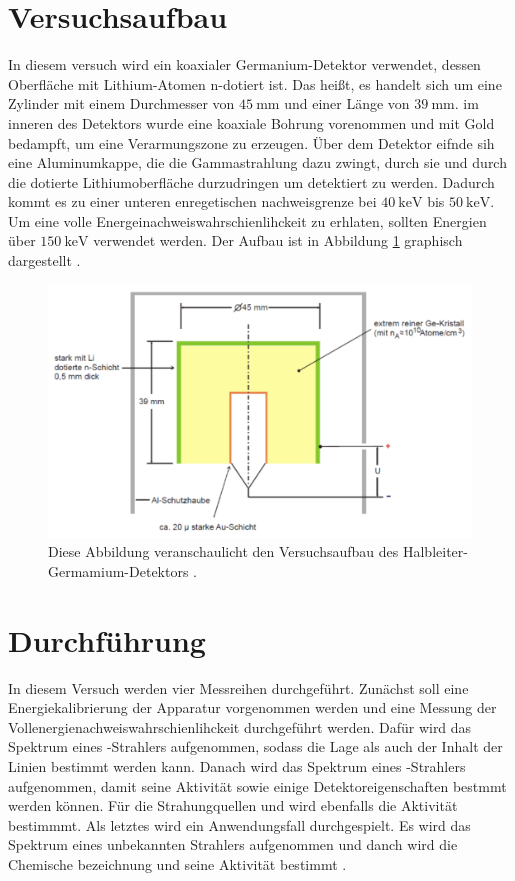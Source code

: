 \section{Versuchsaufbau}
In diesem versuch wird ein koaxialer Germanium-Detektor verwendet,
dessen Oberfläche mit Lithium-Atomen n-dotiert ist. Das heißt, es handelt 
sich um eine Zylinder mit einem Durchmesser von $\SI{45}{\milli\meter}$ und einer 
Länge von $\SI{39}{\milli\meter}$. 
im inneren des Detektors wurde eine koaxiale Bohrung vorenommen und mit Gold 
bedampft, um eine Verarmungszone zu erzeugen. 
Über dem Detektor eifnde sih eine Aluminumkappe, die die Gammastrahlung dazu zwingt, 
durch sie und durch die dotierte Lithiumoberfläche durzudringen um detektiert zu werden.
Dadurch kommt es zu einer unteren enregetischen nachweisgrenze bei 
$\SI{40}{\kilo\electronvolt}$ bis $\SI{50}{\kilo\electronvolt}$.
Um eine volle Energeinachweiswahrschienlihckeit zu erhlaten, sollten  Energien über 
$\SI{150}{\kilo\electronvolt}$ verwendet werden. 
Der Aufbau ist in Abbildung \ref{abb1} graphisch dargestellt \cite{sample}.

\begin{figure}
    \centering
    \includegraphics[width=\textwidth]{figure/Aufbau.pdf}
    \caption{Diese Abbildung veranschaulicht den Versuchsaufbau des Halbleiter-Germamium-Detektors \cite{sample}.}
    \label{abb1}
\end{figure}



\section{Durchführung}
\label{sec:Durchführung}

In diesem Versuch werden vier Messreihen durchgeführt. 
Zunächst soll eine Energiekalibrierung der Apparatur vorgenommen werden und eine 
Messung der Vollenergienachweiswahrschienlihckeit durchgeführt werden.
Dafür wird das Spektrum eines -Strahlers aufgenommen, sodass die Lage 
als auch der Inhalt der Linien bestimmt werden kann.
Danach wird das Spektrum eines -Strahlers aufgenommen, damit seine 
Aktivität sowie einige Detektoreigenschaften bestmmt werden können.
Für die Strahungquellen  und  wird ebenfalls die Aktivität 
bestimmmt.
Als letztes wird ein Anwendungsfall durchgespielt. 
Es wird das Spektrum eines unbekannten Strahlers aufgenommen und danch wird die 
Chemische bezeichnung und seine Aktivität bestimmt \cite{sample}.
